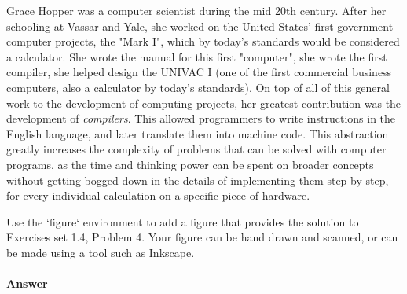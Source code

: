 \documentclass{article}
\begin{document}
Grace Hopper was a computer scientist during the mid 20th century. After her schooling at Vassar and Yale, she worked on the United States' first government computer projects, the "Mark I", which by today's standards would be considered a calculator. She wrote the manual for this first "computer", she wrote the first compiler, she helped design the UNIVAC I (one of the first commercial business computers, also a calculator by today's standards). On top of all of this general work to the development of computing projects, her greatest contribution was the development of \emph{compilers}. This allowed programmers to write instructions in the English language, and later translate them into machine code. This abstraction greatly increases the complexity of problems that can be solved with computer programs, as the time and thinking power can be spent on broader concepts without getting bogged down in the details of implementing them step by step, for every individual calculation on a specific piece of hardware.

\collab{\todo{}}

Use the `figure` environment to add a figure that provides the solution to
Exercises set 1.4, Problem 4.  Your figure can be hand drawn and scanned, or can
be made using a tool such as Inkscape.

\paragraph{Answer}

\end{document}
